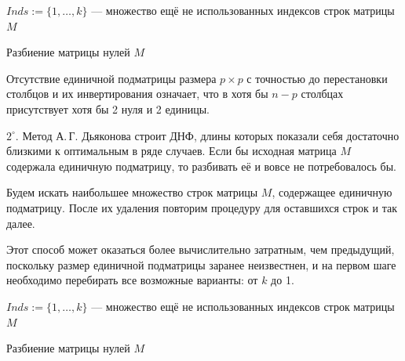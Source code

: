 \documentclass[12pt,a4paper,oneside,fleqn,leqno]{article}
\theoremstyle{definition}
\begin{document}
		\begin{algorithm}[H]
			\SetAlgoLined
			$Inds \mathbin{:=} \{1,\ldots,k\}$ --- множество ещё не использованных индексов строк матрицы $M$\;
			\caption{Разбиение матрицы нулей $M$}
		\label{slice}
		\end{algorithm}\par
			Отсутствие единичной подматрицы размера $p \times p$ с точностью до перестановки столбцов и их инвертирования означает, что в хотя бы $n - p$ столбцах присутствует хотя бы 2 нуля и 2 единицы.\par
			$2^{\circ}.$ Метод А.\,Г. Дьяконова строит ДНФ, длины которых показали себя достаточно близкими к оптимальным в ряде случаев. Если бы исходная матрица $M$ содержала единичную подматрицу, то разбивать её и вовсе не потребовалось бы.\par
			Будем искать наибольшее множество строк матрицы $M$, содержащее единичную подматрицу. После их удаления повторим процедуру для оставшихся строк и так далее.\par
			Этот способ может оказаться более вычислительно затратным, чем предыдущий, поскольку размер единичной подматрицы заранее неизвестнен, и на первом шаге необходимо перебирать все возможные варианты: от $k$ до 1.\par
			\begin{algorithm}[H]
			\SetAlgoLined
			$Inds \mathbin{:=} \{1,\ldots,k\}$ --- множество ещё не использованных индексов строк матрицы $M$\;
			\caption{Разбиение матрицы нулей $M$}
		\label{slice_max_id}
		\end{algorithm}\par
\end{document}
